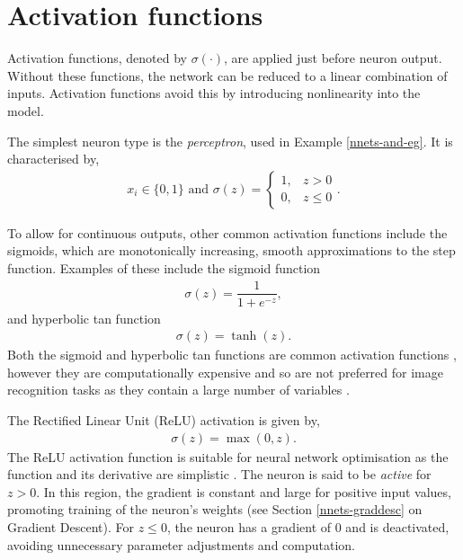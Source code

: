 \section{Activation functions}\label{nnets-act}

Activation functions, denoted by $\sigma(\cdot)$, are applied just before neuron output. Without these functions, the network can be reduced to a linear combination of inputs. Activation functions avoid this by introducing nonlinearity into the model.

The simplest neuron type is the \textit{perceptron}, used in Example \ref{nnets-and-eg}. It is characterised by,
\begin{align}
	x_i \in \{0,1\} \text{ and } \sigma(z) = \begin{cases}
		1, & z > 0 \\
		0, & z \le 0
	\end{cases}.
\end{align}

To allow for continuous outputs, other common activation functions include the sigmoids, which are monotonically increasing, smooth approximations to the step function. Examples of these include the sigmoid function
\begin{align}
	\sigma(z) = \dfrac{1}{1+e^{-z}},
\end{align}
and hyperbolic tan function
\begin{align}
	\sigma(z) = \tanh(z).
\end{align}
Both the sigmoid and hyperbolic tan functions are common activation functions \cite{Goodfellow-et-al-2016}, however they are computationally expensive and so are not preferred for image recognition tasks as they contain a large number of variables \cite{LeCun2012, Nielson2015}.

The Rectified Linear Unit (ReLU) activation \cite{Maas2013} is given by,
\begin{align}
	\sigma(z) = \max(0, z).
\end{align}
The ReLU activation function is suitable for neural network optimisation as the function and its derivative are simplistic \cite{Goodfellow-et-al-2016}. The neuron is said to be \textit{active} for $z > 0$. In this region, the gradient is constant and large for positive input values, promoting training of the neuron's weights (see Section \ref{nnets-graddesc} on Gradient Descent). For $z \leq 0$, the neuron has a gradient of 0 and is deactivated, avoiding unnecessary parameter adjustments and computation. 

